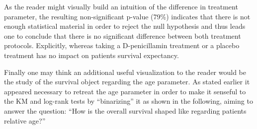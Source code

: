 \documentclass[]{article}
\newenvironment{Shaded}{\begin{snugshade}}{\end{snugshade}}
\newcommand{\KeywordTok}[1]{\textcolor[rgb]{0.13,0.29,0.53}{\textbf{#1}}}
\newcommand{\DataTypeTok}[1]{\textcolor[rgb]{0.13,0.29,0.53}{#1}}
\newcommand{\DecValTok}[1]{\textcolor[rgb]{0.00,0.00,0.81}{#1}}
\newcommand{\StringTok}[1]{\textcolor[rgb]{0.31,0.60,0.02}{#1}}
\newcommand{\CommentTok}[1]{\textcolor[rgb]{0.56,0.35,0.01}{\textit{#1}}}
\newcommand{\OtherTok}[1]{\textcolor[rgb]{0.56,0.35,0.01}{#1}}
\newcommand{\OperatorTok}[1]{\textcolor[rgb]{0.81,0.36,0.00}{\textbf{#1}}}
\newcommand{\NormalTok}[1]{#1}
\begin{document}
As the reader might visually build an intuition of the difference in
treatment parameter, the resulting non-significant p-value (79\%)
indicates that there is not enough statistical material in order to
reject the null hypothesis and thus leads one to conclude that there is
no significant difference between both treatment protocols. Explicitly,
whereas taking a D-penicillamin treatment or a placebo treatment has no
impact on patients survival expectancy.

Finally one may think an additional useful visualization to the reader
would be the study of the survival object regarding the age parameter.
As stated earlier it appeared necessary to retreat the age parameter in
order to make it senseful to the KM and log-rank tests by ``binarizing''
it as shown in the following, aiming to answer the question: ``How is
the overall survival shaped like regarding patients relative age?''

\begin{Shaded}
\end{Shaded}
\end{document}
